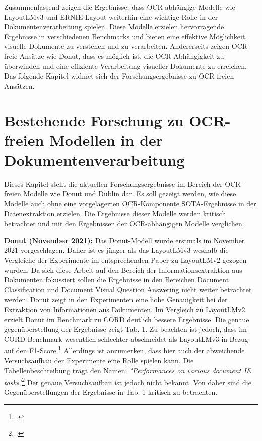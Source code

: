 Zusammenfassend zeigen die Ergebnisse, dass OCR-abhängige Modelle wie LayoutLMv3 und ERNIE-Layout weiterhin eine wichtige Rolle in der Dokumentenverarbeitung spielen. Diese Modelle erzielen hervorragende Ergebnisse in verschiedenen Benchmarks und bieten eine effektive Möglichkeit, visuelle Dokumente zu verstehen und zu verarbeiten. Andererseits zeigen OCR-freie Ansätze wie Donut, dass es möglich ist, die OCR-Abhängigkeit zu überwinden und eine effiziente Verarbeitung visueller Dokumente zu erreichen. Das folgende Kapitel widmet sich der Forschungsergebnisse zu OCR-freien Ansätzen.

\section{Bestehende Forschung zu OCR-freien Modellen in der Dokumentenverarbeitung}
Dieses Kapitel stellt die aktuellen Forschungsergebnisse im Bereich der OCR-freien Modelle wie Donut und Dublin dar. Es soll gezeigt werden, wie diese Modelle auch ohne eine vorgelagerten OCR-Komponente \ac{SOTA}-Ergebnisse in der Datenextraktion erzielen. Die Ergebnisse dieser Modelle werden kritisch betrachtet und mit den Ergebnissen der OCR-abhängigen Modelle verglichen.

\textbf{Donut (November 2021):} Das Donut-Modell wurde erstmals im November 2021 vorgeschlagen. Daher ist es jünger als das LayoutLMv3 weshalb die Vergleiche der Experimente im entsprechenden Paper zu LayoutLMv2 gezogen wurden. Da sich diese Arbeit auf den Bereich der Informationsextraktion aus Dokumenten fokussiert sollen die Ergebnisse in den Bereichen Document Classification und Document Visual Question Answering nicht weiter betrachtet werden. Donut zeigt in den Experimenten eine hohe Genauigkeit bei der Extraktion von Informationen aus Dokumenten. Im Vergleich zu LayoutLMv2 erzielt Donut im Benchmark zu \ac{CORD} deutlich bessere Ergebnisse. Die genaue gegenüberstellung der Ergebnisse zeigt Tab. 1. Zu beachten ist jedoch, dass im \ac{CORD}-Benchmark wesentlich schlechter abschneidet als LayoutLMv3 in Bezug auf den F1-Score.\footcites[Vgl.][S. 10]{kim_ocr-free_2021} Allerdings ist anzumerken, dass hier auch der abweichende Versuchsaufbau der Experimente eine Rolle spielen kann. Die Tabellenbeschreibung trägt den Namen: \emph{"Performances on various document IE tasks"}\footcites[][S. 10]{kim_ocr-free_2021} Der genaue Versuchsaufbau ist jedoch nicht bekannt. Von daher sind die Gegenüberstellungen der Ergebnisse in Tab. 1 kritisch zu betrachten.


